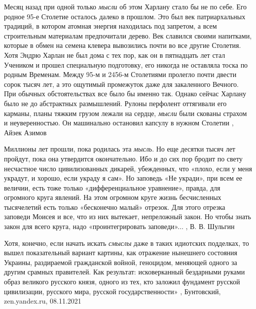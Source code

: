 Месяц назад при одной только \emph{мысли} об этом Харлану стало бы не по себе.
Его родное 95-е Столетие осталось далеко в прошлом. Это был век патриархальных
традиций, в котором атомная энергия находилась под запретом, а всем
строительным материалам предпочитали дерево. Век славился своими напитками,
которые в обмен на семена клевера вывозились почти во все другие Столетия. Хотя
Эндрю Харлан не был дома с тех пор, как он в пятнадцать лет стал Учеником и
прошел специальную подготовку, его никогда не оставляла тоска по родным
Временам. Между 95-м и 2456-м Столетиями пролегло почти двести сорок тысяч лет,
а это ощутимый промежуток даже для закаленного Вечного. При обычных
обстоятельствах все было бы именно так.  Однако сейчас Харлану было не до
абстрактных размышлений. Рулоны перфолент оттягивали его карманы, планы тяжким
грузом лежали на сердце, \emph{мысли} были скованы страхом и неуверенностью. Он
машинально остановил капсулу в нужном Столетии
, Айзек Азимов

Миллионы лет прошли, пока родилась эта \emph{мысль}. Но еще десятки тысяч лет
пройдут, пока она утвердится окончательно. Ибо и до сих пор бродит по свету
несчастное число цивилизованных дикарей, убежденных, что «плохо, если у меня
украдут, и хорошо, если украду я сам».  Но заповедь «Не укради», при всем ее
величии, есть тоже только «дифференциальное уравнение», правда, для огромного
круга явлений. На этом огромном круге жизнь бесчисленных тысячелетий есть
только «бесконечно малый» отрезок. Для этого отрезка заповеди Моисея и все, что
из них вытекает, непреложный закон. Но чтобы знать закон для всего круга, надо
«проинтегрировать заповеди»...
, В. В. Шульгин

Хотя, конечно, если начать искать \emph{смыслы} даже в таких идиотских подделках, то
вышел показательный вариант картины, как отражение нынешнего состояния Украины,
раздираемой гражданской войной, геноцидом, меняющей одного за другим срамных
правителей. Как результат: исковерканный бездарными руками образ великого
русского князя, одного из тех, кто заложил фундамент русской цивилизации,
русского мира, русской государственности»
, Бунтовский, zen.yandex.ru, 08.11.2021

